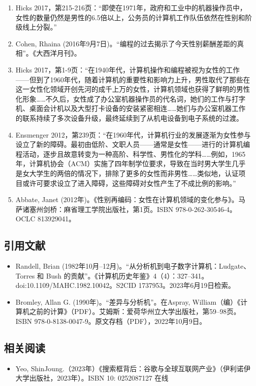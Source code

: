 \begin{enumerate}
\item Hicks 2017，第215-216页：“即使在1971年，政府和工业中的机器操作员中，女性的数量仍然是男性的6.5倍以上，公务员的计算机工作队伍依然在性别和阶级线上分裂。”
\item Cohen, Rhaina (2016年9月7日)。“编程的过去揭示了今天性别薪酬差距的真相”。《大西洋月刊》。
\item Hicks 2017，第1-9页：“在1940年代，计算机操作和编程被视为女性的工作——但到了1960年代，随着计算机的重要性和影响力上升，男性取代了那些在这一女性化领域开创先河的成千上万的女性，计算机领域也获得了鲜明的男性化形象……不久后，女性成了办公室机器操作员的代名词，她们的工作与打字机、桌面会计机以及大型打卡设备的安装紧密相连……她们与办公室机器工作的联系持续了多次设备升级，最终延续到了从机电设备到电子系统的过渡。
\item Ensmenger 2012，第239页：“在1960年代，计算机行业的发展逐渐为女性参与设立了新的障碍。最初由低阶、文职人员——通常是女性——进行的计算机编程活动，逐步且故意转变为一种高阶、科学性、男性化的学科……例如，1965年，计算机协会（ACM）实施了四年制学位要求，导致在当时男大学生几乎是女大学生的两倍的情况下，排除了更多的女性而非男性……类似地，认证项目或许可要求设立了进入障碍，这些障碍对女性产生了不成比例的影响。”
\item Abbate, Janet (2012年)。《性别再编码：女性在计算机领域的变化参与》。马萨诸塞州剑桥：麻省理工学院出版社，第1页。ISBN 978-0-262-30546-4。OCLC 813929041。
\end{enumerate}
\subsection{引用文献}
\begin{itemize}
\item Randell, Brian (1982年10月–12月)。“从分析机到电子数字计算机：Ludgate、Torres 和 Bush 的贡献”。《计算机历史年鉴》4（4）：327–341。doi:10.1109/MAHC.1982.10042。S2CID 1737953。2023年6月19日检索。
\item Bromley, Allan G. (1990年)。“差异与分析机”。在Aspray, William（编）《计算机之前的计算》（PDF）。艾姆斯：爱荷华州立大学出版社，第59–98页。ISBN 978-0-8138-0047-9。原文存档（PDF），2022年10月9日。
\end{itemize}
\subsection{相关阅读}
\begin{itemize}
\item  Yeo, ShinJoung.（2023年）《搜索框背后：谷歌与全球互联网产业》（伊利诺伊大学出版社，2023年）。ISBN 10: 0252087127 在线
\end{itemize}

